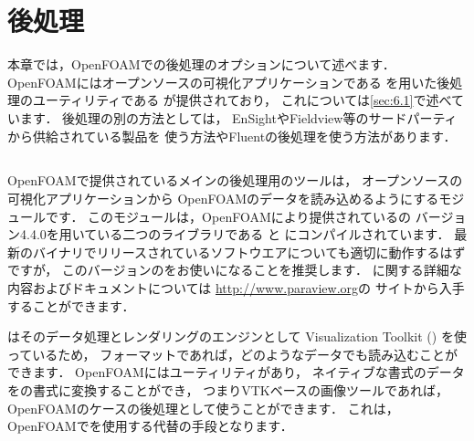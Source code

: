 \chapter{後処理}
\label{chap:6}
%
本章では，OpenFOAMでの後処理のオプションについて述べます．
OpenFOAMにはオープンソースの可視化アプリケーションである
を用いた後処理のユーティリティである
が提供されており，
これについては\autoref{sec:6.1}で述べています．
後処理の別の方法としては，
EnSightやFieldview等のサードパーティから供給されている製品を
使う方法やFluentの後処理を使う方法があります．



\section{}
\label{sec:6.1}
%
%
%
%
%
%
OpenFOAMで提供されているメインの後処理用のツールは，
オープンソースの可視化アプリケーションから
OpenFOAMのデータを読み込めるようにするモジュールです．
このモジュールは，OpenFOAMにより提供されているの
バージョン4.4.0を用いている二つのライブラリである
%
%
と
%
%
にコンパイルされています．
最新のバイナリでリリースされているソフトウエアについても適切に動作するはずですが，
このバージョンのをお使いになることを推奨します．
に関する詳細な内容およびドキュメントについては
\url{http://www.paraview.org}の
サイトから入手することができます．

はそのデータ処理とレンダリングのエンジンとして
Visualization Toolkit () を使っているため，
フォーマットであれば，どのようなデータでも読み込むことができます．
OpenFOAMにはユーティリティがあり，
ネイティブな書式のデータをの書式に変換することができ，
つまりVTKベースの画像ツールであれば，OpenFOAMのケースの後処理として使うことができます．
これは，OpenFOAMでを使用する代替の手段となります．

